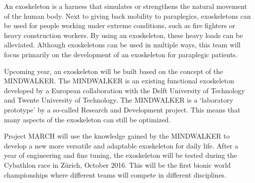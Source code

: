 An exoskeleton is a harness that simulates or strengthens the natural movement of the human body. Next to giving back mobility to paraplegics, exoskeletons can be used for people working under extreme conditions, such as fire fighters or heavy construction workers. By using an exoskeleton, these heavy loads can be alleviated. Although exoskeletons can be used in multiple ways, this team will focus primarily on the development of an exoskeleton for paraplegic patients.

Upcoming year, an exoskeleton will be built based on the concept of the MINDWALKER. The MINDWALKER is an existing functional exoskeleton developed by a European collaboration with the Delft University of Technology and Twente University of Technology. The MINDWALKER is a `laboratory prototype' by a so-called Research and Development project. This means that many aspects of the exoskeleton can still be optimized.

Project MARCH will use the knowledge gained by the MINDWALKER to develop a new more versatile and adaptable exoskeleton for daily life. After a year of engineering and fine tuning, the exoskeleton will be tested during the Cybathlon race in Zürich, October 2016. This will be the first bionic world championships where different teams will compete in different disciplines.